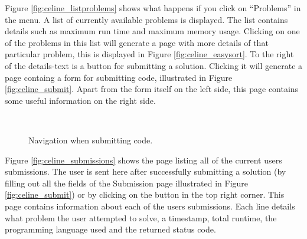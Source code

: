 Figure \ref{fig:celine_listproblems} shows what happens if you click on ``Problems'' in the menu. A list of currently available problems is displayed. The list contains details such as maximum run time and maximum memory usage. Clicking on one of the problems in this list will generate a page with more details of that particular problem, this is displayed in Figure \ref{fig:celine_easysort}. To the right of the details-text is a button for submitting a solution. Clicking it will generate a page containg a form for submitting code, illustrated in Figure \ref{fig:celine_submit}. Apart from the form itself on the left side, this page contains some useful information on the right side.

\begin{figure}[h]
\centering
\mbox{
}
\caption{Navigation when submitting code.}
\label{fig:celine_split_submit_submissions}
\end{figure}

Figure \ref{fig:celine_submissions} shows the page listing all of the current users submissions. The user is sent here after successfully submitting a solution (by filling out all the fields of the Submission page illustrated in Figure \ref{fig:celine_submit}) or by clicking on the button in the top right corner. This page contains information about each of the users submissions. Each line details what problem the user attempted to solve, a timestamp, total runtime, the programming language used and the returned status code. 


